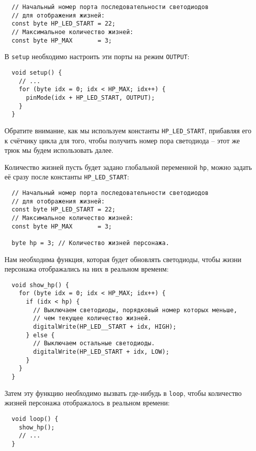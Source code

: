 \documentclass[../sparc.tex]{subfiles}
\begin{document}
\begin{verbatim}
  // Начальный номер порта последовательности светодиодов
  // для отображения жизней:
  const byte HP_LED_START = 22;
  // Максимальное количество жизней:
  const byte HP_MAX       = 3;
\end{verbatim}

В \texttt{setup} необходимо настроить эти порты на режим \texttt{OUTPUT}:

\begin{verbatim}
  void setup() {
    // ...
    for (byte idx = 0; idx < HP_MAX; idx++) {
      pinMode(idx + HP_LED_START, OUTPUT);
    }
  }
\end{verbatim}

Обратите внимание, как мы используем константы \texttt{HP\_LED\_START},
прибавляя его к счётчику цикла для того, чтобы получить номер пора светодиода --
этот же трюк мы будем использовать далее.

Количество жизней пусть будет задано глобальной переменной \texttt{hp}, можно
задать её сразу после константы \texttt{HP\_LED\_START}:

\begin{verbatim}
  // Начальный номер порта последовательности светодиодов
  // для отображения жизней:
  const byte HP_LED_START = 22;
  // Максимальное количество жизней:
  const byte HP_MAX       = 3;

  byte hp = 3; // Количество жизней персонажа.
\end{verbatim}

Нам необходима функция, которая будет обновлять светодиоды, чтобы жизни
персонажа отображались на них в реальном временм:

\begin{verbatim}
  void show_hp() {
    for (byte idx = 0; idx < HP_MAX; idx++) {
      if (idx < hp) {
        // Выключаем светодиоды, порядковый номер которых меньше,
        // чем текущее количество жизней.
        digitalWrite(HP_LED__START + idx, HIGH);
      } else {
        // Выключаем остальные светодиоды.
        digitalWrite(HP_LED_START + idx, LOW);
      }
    }
  }
\end{verbatim}

Затем эту функцию необходимо вызвать где-нибудь в \texttt{loop}, чтобы
количество жизней персонажа отображалось в реальном времени:

\begin{verbatim}
  void loop() {
    show_hp();
    // ...
  }
\end{verbatim}
\end{document}
